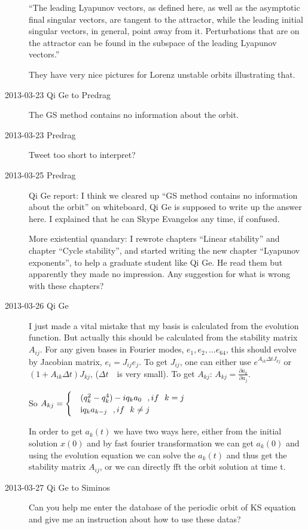 \begin{description}
``The leading Lyapunov vectors, as defined here, as well as the
asymptotic final singular vectors, are tangent to the attractor,
while the leading initial singular vectors, in general, point away
from it. Perturbations that are on the attractor can be found in the
subspace of the leading Lyapunov vectors.''

They have very nice pictures for Lorenz unstable orbits illustrating that.

\item[2013-03-23 Qi Ge to Predrag]
The
GS method contains no information about the orbit.
\item[2013-03-23 Predrag]
Tweet too short to interpret?

\item[2013-03-25 Predrag] Qi Ge report: I think we cleared up ``GS method
contains no information about the orbit'' on whiteboard, Qi Ge is
supposed to write up the answer here. I explained that he can Skype
Evangelos any time, if confused.

More existential quandary: I rewrote chapters
 {``Linear stability''}
and chapter  {``Cycle
stability''}, and started writing the new chapter
 {``Lyapunov
exponents''}, to help a graduate student like Qi Ge. He read them but
apparently they made no impression. Any suggestion for what is wrong with
these chapters?

\item[2013-03-26 Qi Ge]
I just made a vital mistake that my basis is calculated from the evolution function. But actually this should be calculated from the stability matrix \(A_{ij}\).
For any given bases in Fourier modes, \(e_1, e_2,... e_{64}\), this should evolve by Jacobian matrix, \(e_i = J_{ij}e_j\).
To get \(J_{ij}\), one can either use \(e^{A_{ik}\Delta{t}J_{kj}}\) or\((1+A_{ik}\Delta{t})J_{kj}\), (\(\Delta{t}\)~~is very small).
To get \(A_{kj}\): \(A_{kj}=\frac{\partial{\dot{a_k}}}{\partial{a_j}}\).

So \(A_{kj}=
\begin{cases}
 & \text(q_{k}^2-q_{k}^4)-iq_ka_0~~,{if}~~ k=j \\
 & \text iq_ka_{k-j}~~,{ if }~~ k\neq j
\end{cases}\)

In order to get \(a_k(t)\) we have two ways here, either from the initial solution \(x(0)\) and by fast fourier transformation we can get \(a_k(0)\) and using the evolution equation we can solve the \(a_k(t)\) and thus get the stability matrix \(A_{ij}\), or we can directly fft the orbit solution at time t.

\item[2013-03-27 Qi Ge to Siminos]
Can you help me enter the database of the periodic orbit of KS equation and give me an instruction about how to use these datas?
\end{description}

\renewcommand{\ssp}{a}
